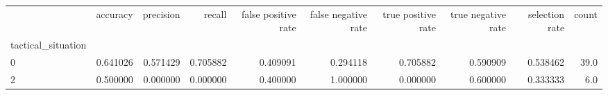 \begin{tabular}{lrrrrrrrrr}
\toprule
{} &  accuracy &  precision &    recall &  false positive rate &  false negative rate &  true positive rate &  true negative rate &  selection rate &  count \\
tactical\_situation &           &            &           &                      &                      &                     &                     &                 &        \\
\midrule
0                  &  0.641026 &   0.571429 &  0.705882 &             0.409091 &             0.294118 &            0.705882 &            0.590909 &        0.538462 &   39.0 \\
2                  &  0.500000 &   0.000000 &  0.000000 &             0.400000 &             1.000000 &            0.000000 &            0.600000 &        0.333333 &    6.0 \\
\bottomrule
\end{tabular}
